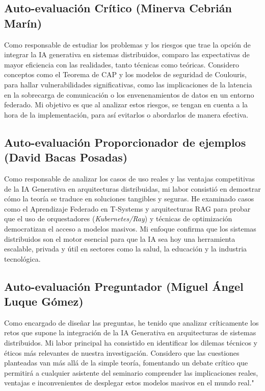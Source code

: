 \documentclass[runningheads]{llncs}
\begin{document}
\subsection{Auto-evaluación Crítico (Minerva Cebrián Marín)}

Como responsable de estudiar los problemas y los riesgos que trae la opción de integrar la IA generativa en sistemas distribuidos, comparo las expectativas de mayor eficiencia con las realidades, tanto técnicas como teóricas. Considero conceptos como el Teorema de CAP y los modelos de seguridad de Coulouris, para hallar vulnerabilidades significativas, como las implicaciones de la latencia en la sobrecarga de comunicación o los envenenamientos de datos en un entorno federado. Mi objetivo es que al analizar estos riesgos, se tengan en cuenta a la hora de la implementación, para así evitarlos o abordarlos de manera efectiva.

\subsection{Auto-evaluación Proporcionador de ejemplos (David Bacas Posadas)}

Como responsable de analizar los casos de uso reales y las ventajas competitivas de la IA Generativa en arquitecturas distribuidas, mi labor consistió en demostrar cómo la teoría se traduce en soluciones tangibles y seguras. He examinado casos como el Aprendizaje Federado en T-Systems y arquitecturas RAG para probar que el uso de orquestadores (\textit{Kubernetes/Ray}) y técnicas de optimización democratizan el acceso a modelos masivos. Mi enfoque confirma que los sistemas distribuidos son el motor esencial para que la IA sea hoy una herramienta escalable, privada y útil en sectores como la salud, la educación y la industria tecnológica.

\subsection{Auto-evaluación Preguntador (Miguel Ángel Luque Gómez)}

Como encargado de diseñar las preguntas, he tenido que analizar críticamente los retos que supone la integración de la IA Generativa en arquitecturas de sistemas distribuidos. Mi labor principal ha consistido en identificar los dilemas técnicos y éticos más relevantes de nuestra investigación. Considero que las cuestiones planteadas van más allá de la simple teoría, fomentando un debate crítico que permitirá a cualquier asistente del seminario comprender las implicaciones reales, ventajas e inconvenientes de desplegar estos modelos masivos en el mundo real."
\end{document}
